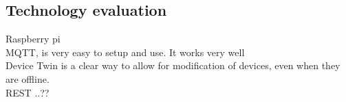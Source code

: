 \subsection*{Technology evaluation}
Raspberry pi \\
MQTT, is very easy to setup and use. It works very well\\
Device Twin is a clear way to allow for modification of devices, even when they are offline.\\
REST ..??
